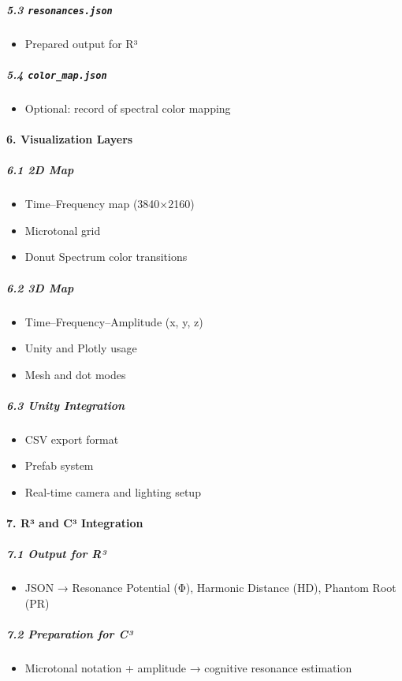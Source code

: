\subparagraph{5.3 \texttt{resonances.json}}  
\begin{itemize}
    \item Prepared output for R³
\end{itemize}

\subparagraph{5.4 \texttt{color\_map.json}}  
\begin{itemize}
    \item Optional: record of spectral color mapping
\end{itemize}

\paragraph{6. Visualization Layers}

\subparagraph{6.1 2D Map}
\begin{itemize}
    \item Time–Frequency map (3840×2160)
    \item Microtonal grid
    \item Donut Spectrum color transitions
\end{itemize}

\subparagraph{6.2 3D Map}
\begin{itemize}
    \item Time–Frequency–Amplitude (x, y, z)
    \item Unity and Plotly usage
    \item Mesh and dot modes
\end{itemize}

\subparagraph{6.3 Unity Integration}
\begin{itemize}
    \item CSV export format
    \item Prefab system
    \item Real-time camera and lighting setup
\end{itemize}

\paragraph{7. R³ and C³ Integration}

\subparagraph{7.1 Output for R³}
\begin{itemize}
    \item JSON → Resonance Potential (Φ), Harmonic Distance (HD), Phantom Root (PR)
\end{itemize}

\subparagraph{7.2 Preparation for C³}
\begin{itemize}
    \item Microtonal notation + amplitude → cognitive resonance estimation
\end{itemize}

